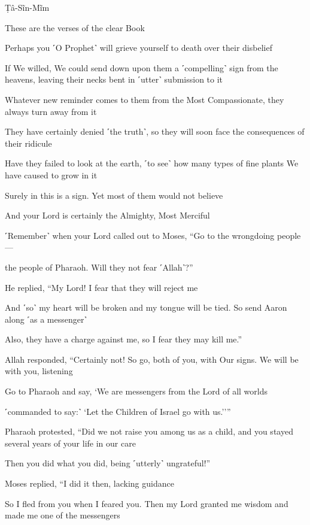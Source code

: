 Ṭâ-Sĩn-Mĩm

These are the verses of the clear Book

Perhaps you ˹O Prophet˺ will grieve yourself to death over their disbelief

If We willed, We could send down upon them a ˹compelling˺ sign from the heavens, leaving their necks bent in ˹utter˺ submission to it

Whatever new reminder comes to them from the Most Compassionate, they always turn away from it

They have certainly denied ˹the truth˺, so they will soon face the consequences of their ridicule

Have they failed to look at the earth, ˹to see˺ how many types of fine plants We have caused to grow in it

Surely in this is a sign. Yet most of them would not believe

And your Lord is certainly the Almighty, Most Merciful

˹Remember˺ when your Lord called out to Moses, “Go to the wrongdoing people—

the people of Pharaoh. Will they not fear ˹Allah˺?”

He replied, “My Lord! I fear that they will reject me

And ˹so˺ my heart will be broken and my tongue will be tied. So send Aaron along ˹as a messenger˺

Also, they have a charge against me, so I fear they may kill me.”

Allah responded, “Certainly not! So go, both of you, with Our signs. We will be with you, listening

Go to Pharaoh and say, ‘We are messengers from the Lord of all worlds

˹commanded to say:˺ ‘Let the Children of Israel go with us.’’”

Pharaoh protested, “Did we not raise you among us as a child, and you stayed several years of your life in our care

Then you did what you did, being ˹utterly˺ ungrateful!”

Moses replied, “I did it then, lacking guidance

So I fled from you when I feared you. Then my Lord granted me wisdom and made me one of the messengers

